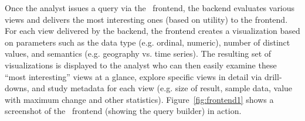 Once the analyst issues a query via the \SeeDB\ frontend, the backend
evaluates various views and delivers the most interesting ones (based on
utility) to the frontend.
For each view delivered by the backend, the frontend creates a visualization
based on parameters such as the data
type (e.g. ordinal, numeric), number of distinct values, and semantics (e.g.
geography vs. time series).
The resulting set of visualizations is displayed to the analyst who can then
easily examine these ``most interesting'' views at a glance, explore specific views in
detail via drill-downs, 
and study metadata for each view (e.g. size of result, sample data, value with
maximum change and other statistics). 
Figure~\ref{fig:frontend1} shows a screenshot of the \SeeDB\ frontend (showing
the query builder) in action.
 

